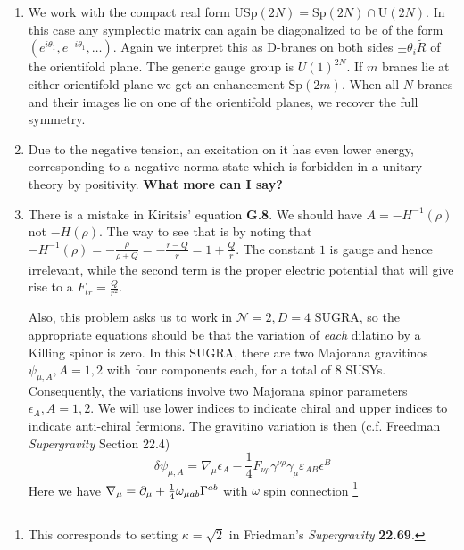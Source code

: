 \documentclass[11pt, class=article, crop=false]{standalone}
\begin{document}
\begin{enumerate}
	
	\item %
	We work with the compact real form $\mathrm{USp}(2N) = \mathrm{Sp}(2N) \cap \mathrm U(2N)$. In this case any symplectic matrix can again be diagonalized to be of the form $(e^{i \theta_1}, e^{-i\theta_1}, \dots )$. Again we interpret this as D-branes on both sides $\pm \theta_i \tilde R$ of the orientifold plane. The generic gauge group is $U(1)^{2N}$. If $m$ branes lie at either orientifold plane we get an enhancement $\mathrm{Sp}(2m)$. When all $N$ branes and their images lie on one of the orientifold planes, we recover the full symmetry. 
	
	\item Due to the negative tension, an excitation on it has even lower energy, corresponding to a negative norma state which is forbidden in a unitary theory by positivity. \textbf{What more can I say? }
	
	\item There is a mistake in Kiritsis' equation \textbf{G.8}. We should have $A = -H^{-1}(\rho)$ not $-H(\rho)$. The way to see that is by noting that $-H^{-1}(\rho) = -\frac{\rho}{\rho+Q} = -\frac{r-Q}{r} = 1 + \frac{Q}{r}$. The constant $1$ is gauge and hence irrelevant, while the second term is the proper electric potential that will give rise to a $F_{tr} = \frac{Q}{r^2}$.
	
	Also, this problem asks us to work in $\mathcal N =2, D = 4$ SUGRA, so the appropriate equations should be that the variation of \emph{each} dilatino by a Killing spinor is zero. In this SUGRA, there are two Majorana gravitinos $
\psi_{\mu, A}, A=1,2$ with four components each, for a total of $8$ SUSYs. Consequently, the variations involve two Majorana spinor parameters $\epsilon_{A}, A=1,2$. We will use lower indices to indicate chiral and upper indices to indicate anti-chiral fermions. The gravitino variation is then (c.f. Freedman \emph{Supergravity} Section 22.4)
\begin{equation}\label{eq:SUSYvar}
		\delta \psi_{\mu, A} = \nabla_\mu \epsilon_A - \frac14 F_{\nu \rho} \gamma^{\nu \rho} \gamma_\mu \varepsilon_{AB} \epsilon^B
\end{equation}
	Here we have $\nabla_\mu = \partial_\mu + \frac14 \omega_{\mu ab} \Gamma^{ab}$ with $\omega$ spin connection \footnote{This corresponds to setting $\kappa = \sqrt 2$ in Friedman's \emph{Supergravity} \textbf{22.69}.}


\end{enumerate}
\end{document}
